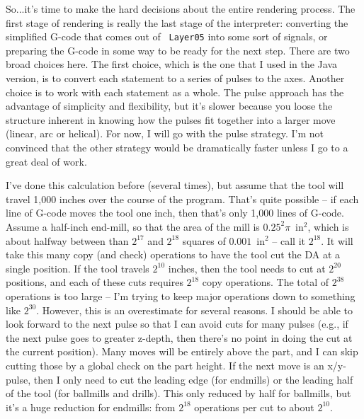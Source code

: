 \documentclass[titlepage,oneside,10pt]{article}
\begin{document}
So...it's time to make the hard decisions about the entire rendering
process. The first stage of rendering is really the last stage of the
interpreter: converting the simplified G-code that comes out of {\tt
  Layer05} into some sort of signals, or preparing the G-code in some
way to be ready for the next step. There are two broad choices
here. The first choice, which is the one that I used in the Java
version, is to convert each statement to a series of pulses to the
axes. Another choice is to work with each statement as a whole. The
pulse approach has the advantage of simplicity and flexibility, but
it's slower because you loose the structure inherent in knowing how
the pulses fit together into a larger move (linear, arc or
helical). For now, I will go with the pulse strategy. I'm not
convinced that the other strategy would be dramatically faster unless
I go to a great deal of work.

I've done this calculation before (several times), but assume that the
tool will travel 1,000 inches over the course of the program. That's
quite possible -- if each line of G-code moves the tool one inch, then
that's only 1,000 lines of G-code. Assume a half-inch end-mill, so
that the area of the mill is $0.25^2\pi$~in$^2$, which is about
halfway between than $2^{17}$ and $2^{18}$ squares of $0.001$~in$^2$
-- call it $2^{18}$. It will take this many copy (and check)
operations to have the tool cut the DA at a single position. If the
tool travels $2^{10}$ inches, then the tool needs to cut at $2^{20}$
positions, and each of these cuts requires $2^{18}$ copy
operations. The total of $2^{38}$ operations is too large -- I'm
trying to keep major operations down to something like
$2^{30}$. However, this is an overestimate for several reasons. I
should be able to look forward to the next pulse so that I can avoid
cuts for many pulses (e.g., if the next pulse goes to greater z-depth,
then there's no point in doing the cut at the current
position). Many moves will be entirely above the part, and I can skip
cutting those by a global check on the part height. If the next move
is an x/y-pulse, then I only need to cut the leading edge (for
endmills) or the leading half of the tool (for ballmills and
drills). This only reduced by half for ballmills, but it's a huge
reduction for endmills: from $2^{18}$ operations per cut to about
$2^{10}$.
\end{document}
